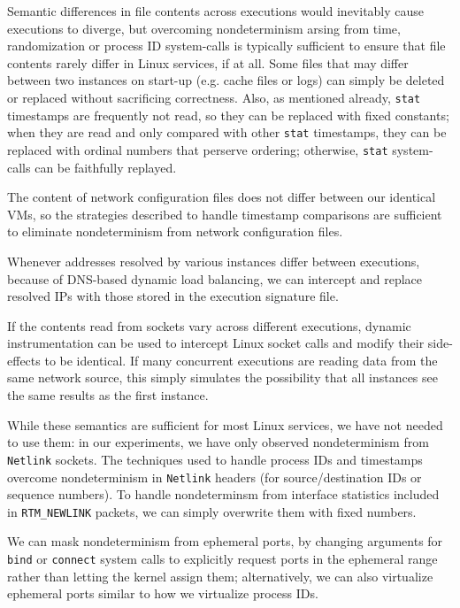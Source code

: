  \newline
Semantic differences in file contents across
executions would inevitably cause executions
to diverge, but overcoming nondeterminism arsing
from time, randomization or process ID system-calls
is typically sufficient to ensure that
file contents rarely differ in Linux services,
if at all. Some files that may differ
between two instances on start-up (e.g. 
cache files or logs) can simply be 
deleted or replaced without sacrificing correctness.
Also, as mentioned already, \texttt{stat} 
timestamps are frequently not read, so
they can be replaced with fixed constants;
when they are read and only compared with other
\texttt{stat} timestamps, they can be replaced with 
ordinal numbers that perserve ordering;  
otherwise, \texttt{stat} system-calls 
can be faithfully replayed. \newline

 \newline
The content of network configuration files
does not differ between our identical VMs, so the strategies 
described to handle timestamp comparisons are sufficient
to eliminate nondeterminism from network configuration files.
 
Whenever addresses resolved by various instances differ
between executions, because of DNS-based dynamic load balancing, 
we can intercept and replace resolved IPs with those
stored in the execution signature file.

If the contents read from sockets vary across different executions,
dynamic instrumentation can be used to intercept Linux socket calls
and modify their side-effects to be identical. If
many concurrent executions are reading data from the
same network source, this simply simulates the possibility that all instances
see the same results as the first instance. 

While these semantics are sufficient for most Linux services,
we have not needed to use them: in our experiments,
we have only observed nondeterminism from \texttt{Netlink}
sockets. The techniques used to handle
process IDs and timestamps overcome nondeterminism
in \texttt{Netlink} headers (for source/destination IDs
or sequence numbers). To handle
nondeterminsm from interface statistics
included in \texttt{RTM\_NEWLINK} packets,
we can simply overwrite them with fixed
numbers. \newline

We can mask nondeterminism from ephemeral ports, 
by changing arguments for \texttt{bind} or \texttt{connect} 
system calls to explicitly request ports
in the ephemeral range rather than letting the kernel 
assign them; alternatively,
we can also virtualize ephemeral ports
similar to how we virtualize process IDs. \newline

